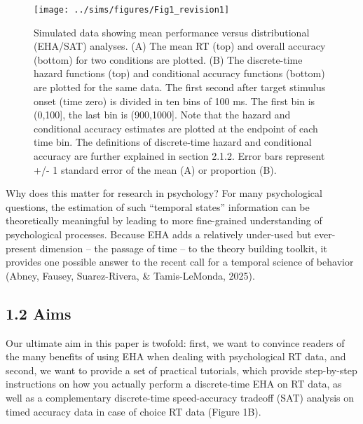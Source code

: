 \documentclass[
  man, donotrepeattitle,floatsintext]{apa6}
\begin{document}
\begin{figure}[H]

{\centering \texttt{[image: ../sims/figures/Fig1\_revision1]} 

}

\caption{Simulated data showing mean performance versus distributional (EHA/SAT) analyses. (A) The mean RT (top) and overall accuracy (bottom) for two conditions are plotted. (B) The discrete-time hazard functions (top) and conditional accuracy functions (bottom) are plotted for the same data. The first second after target stimulus onset (time zero) is divided in ten bins of 100 ms. The first bin is (0,100{]}, the last bin is (900,1000{]}. Note that the hazard and conditional accuracy estimates are plotted at the endpoint of each time bin. The definitions of discrete-time hazard and conditional accuracy are further explained in section 2.1.2. Error bars represent +/- 1 standard error of the mean (A) or proportion (B).}\label{fig:plot1}
\end{figure}

Why does this matter for research in psychology? For many psychological questions, the estimation of such ``temporal states'' information can be theoretically meaningful by leading to more fine-grained understanding of psychological processes. Because EHA adds a relatively under-used but ever-present dimension -- the passage of time -- to the theory building toolkit, it provides one possible answer to the recent call for a temporal science of behavior (Abney, Fausey, Suarez-Rivera, \& Tamis-LeMonda, 2025).

\subsection{1.2 Aims}\label{aims}

Our ultimate aim in this paper is twofold: first, we want to convince readers of the many benefits of using EHA when dealing with psychological RT data, and second, we want to provide a set of practical tutorials, which provide step-by-step instructions on how you actually perform a discrete-time EHA on RT data, as well as a complementary discrete-time speed-accuracy tradeoff (SAT) analysis on timed accuracy data in case of choice RT data (Figure 1B).
\end{document}
